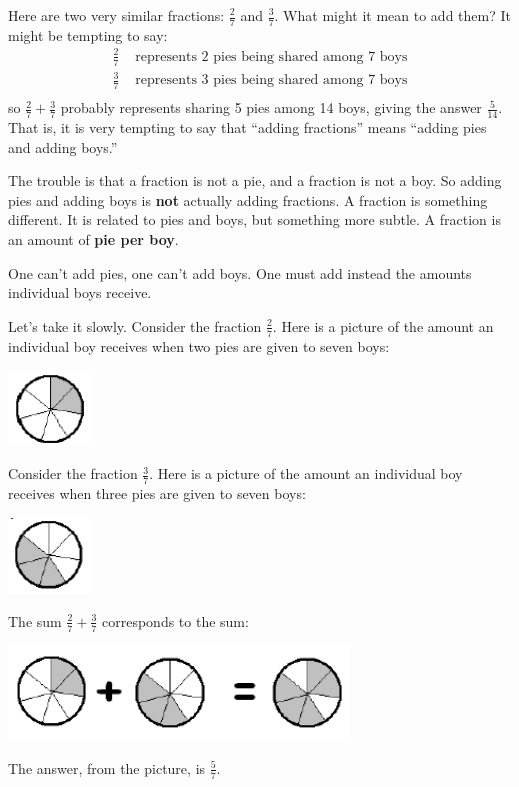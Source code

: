 Here are two very similar fractions:
$\frac 2 7$ and $\frac 3 7$.
What might it mean to add them?
It might be tempting to say:
\begin{align*}
\frac 2 7 &
\text{ represents 2 pies being shared among 7 boys}\\
\frac 3 7 &
\text{ represents 3 pies being shared among 7 boys}\\
\end{align*}
so
$\frac 2 7 + \frac 3 7$ 
probably represents sharing 5 pies among 14 boys, giving the answer
$\frac 5{14}$.
That is, it is very tempting to say that ``adding fractions'' means  ``adding pies and 
adding boys.''

The trouble is that a fraction is not a pie, and a fraction is not a boy. So adding
pies and adding boys is {\bf not} actually adding fractions. 
A fraction is something
different. It is related to pies and boys, but something more subtle. A fraction is
an amount of {\bf pie per boy}.

One can't add pies, one can't add boys. One must add instead the amounts individual
boys receive.

\begin{example}
Let's take it slowly.
Consider the fraction $\frac 2 7$.
Here is a picture of the amount an individual boy receives when two pies are given to seven boys:
   \begin{center}
\includegraphics[height = 2cm]{2seventhspie}
\end{center}



Consider the fraction $\frac 3 7$.
Here is a picture of the amount an individual boy receives
when three pies are given to seven boys:
   \begin{center}
\includegraphics[height = 2cm]{3seventhspie}
\end{center}


The sum
$\frac 2 7 + \frac 3 7 $
corresponds to the sum:

   \begin{center}
\includegraphics[height = 2.5cm]{addseventhspie}
\end{center}



The answer, from the picture, is $\frac 5 7$.
\end{example}

